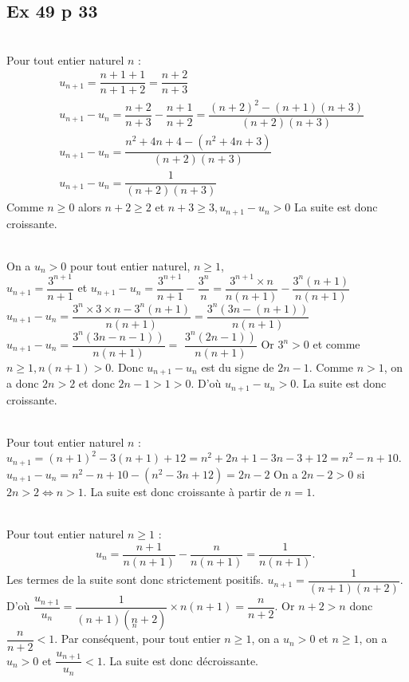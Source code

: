 \documentclass[a4paper,french]{book}
\begin{document}
\subsection*{Ex 49 p 33}
\begin{enumMet}
    \item {}\\
    Pour tout entier naturel $n$ :
    $$
    \begin{aligned}
    &u_{n+1}=\dfrac{n+1+1}{n+1+2}=\dfrac{n+2}{n+3} \\
    &u_{n+1}-u_{n}=\dfrac{n+2}{n+3}-\dfrac{n+1}{n+2}=\dfrac{(n+2)^{2}-(n+1)(n+3)}{(n+2)(n+3)} \\
    &u_{n+1}-u_{n}=\dfrac{n^{2}+4 n+4-\left(n^{2}+4 n+3\right)}{(n+2)(n+3)} \\
    &u_{n+1}-u_{n}=\dfrac{1}{(n+2)(n+3)}
    \end{aligned}
    $$
    Comme $n \geq 0$ alors $n+2 \geq 2$ et $n+3 \geq 3, u_{n+1}-u_{n}>0$
    La suite est donc croissante.
    \item {}\\
    On a $u_{n}>0$ pour tout entier naturel, $n \geqslant 1$,\\
    $u_{n+1}=\dfrac{3^{n+1}}{n+1}$ et
    $u_{n+1}-u_{n}=\dfrac{3^{n+1}}{n+1}-\dfrac{3^{n}}{n}=\dfrac{3^{n+1} \times n}{n(n+1)}-\dfrac{3^{n}(n+1)}{n(n+1)}$\\
    $u_{n+1}-u_{n}=\dfrac{3^{n} \times 3 \times n-3^{n}(n+1)}{n(n+1)}=\dfrac{3^{n}(3 n-(n+1))}{n(n+1)}$\\
    $u_{n+1}-u_{n}=\dfrac{\left.3^{n}(3 n-n-1)\right)}{n(n+1)}=$
    $\dfrac{\left.3^{n}(2 n-1)\right)}{n(n+1)}$
    Or $3^{n}>0$ et comme $n \geq 1, n(n+1)>0$. Donc $u_{n+1}-u_{n}$ est du signe de $2 n-1$.
    Comme $n>1$, on a donc $2 n>2$ et donc $2 n-1>1>0$. D'où $u_{n+1}-u_{n}>0$. La suite est donc croissante.
    \item {}\\
    Pour tout entier naturel $n$ :\\
    $u_{n+1}=(n+1)^{2}-3(n+1)+12=n^{2}+2 n+1-3 n-3+12=n^{2}-n+10$.
    $u_{n+1}-u_{n}=n^{2}-n+10-\left(n^{2}-3 n+12\right)=2 n-2$
    On a $2 n-2>0$ si $2 n>2 \Longleftrightarrow n>1$. La suite est donc croissante à partir de $n=1$.
    \item {}\\
    Pour tout entier naturel $n \geqslant 1$ :
    $$
    u_{n}=\dfrac{n+1}{n(n+1)}-\dfrac{n}{n(n+1)}=\dfrac{1}{n(n+1)} \text {. }
    $$
    Les termes de la suite sont donc strictement positifs.
    $u_{n+1}=\dfrac{1}{(n+1)(n+2)}$.
    D'où $\dfrac{u_{n+1}}{u_{n}}=\dfrac{1}{(n+1)(\underset{n}{n}+2)} \times n(n+1)=\dfrac{n}{n+2}$.
    Or $n+2>n$ donc $\dfrac{n}{n+2}<1$.
    Par conséquent, pour tout entier $n \geqslant 1$, on a $u_{n}>0$ et $n \geqslant 1$, on a $u_{n}>0$ et $\dfrac{u_{n+1}}{u_{n}}<1$.
    La suite est donc décroissante.
\end{enumMet}
\end{document}
